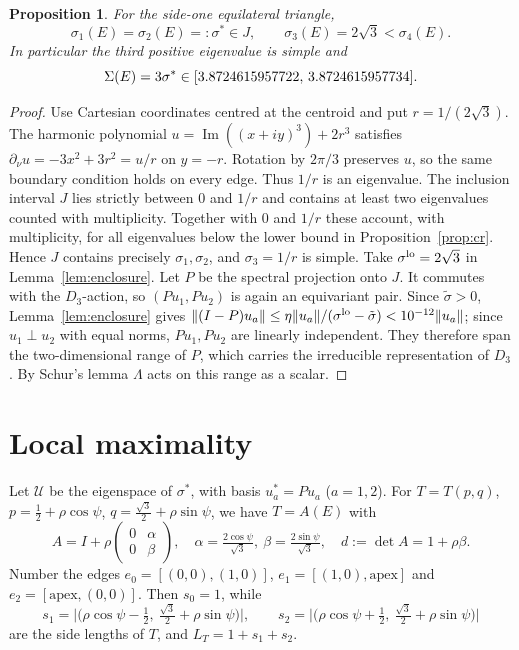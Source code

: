 \documentclass[11pt]{article}
\newtheorem{proposition}[theorem]{Proposition}
\theoremstyle{definition}
\theoremstyle{remark}
\newcommand{\Lam}{\Lambda}
\renewcommand{\Im}{\operatorname{Im}}
\begin{document}
\begin{proposition}\label{prop:eq}
For the side-one equilateral triangle,
\[
\sigma_1(E)=\sigma_2(E)=:\sigma^*\in J,\qquad \sigma_3(E)=2\sqrt3<\sigma_4(E).
\]
In particular the third positive eigenvalue is simple and
\[\Sigma(E)=3\sigma^*\in[3.8724615957722,\,3.8724615957734].\]
\end{proposition}
\begin{proof}
Use Cartesian coordinates centred at the centroid and put $r=1/(2\sqrt3)$. The harmonic polynomial
$u=\Im((x+iy)^3)+2r^3$ satisfies $\partial_\nu u=-3x^2+3r^2=u/r$ on $y=-r$.
Rotation by $2\pi/3$ preserves $u$, so the same boundary condition holds on every edge.
Thus $1/r$ is an eigenvalue. The inclusion interval $J$ lies strictly between $0$ and $1/r$ and
contains at least two eigenvalues counted with multiplicity. Together with $0$ and $1/r$ these
account, with multiplicity, for all eigenvalues below the lower bound in Proposition~\ref{prop:cr}. Hence $J$ contains precisely
$\sigma_1,\sigma_2$, and $\sigma_3=1/r$ is simple. Take $\sigma^{\rm lo}=2\sqrt3$ in Lemma~\ref{lem:enclosure}.
Let $P$ be the spectral projection onto $J$. It commutes with the
$D_3$-action, so $(Pu_1,Pu_2)$ is again an equivariant pair. Since $\tilde\sigma>0$, Lemma~\ref{lem:enclosure} gives
$\|(I-P)u_a\|\le\eta\|u_a\|/(\sigma^{\rm lo}-\tilde\sigma)<10^{-12}\|u_a\|$; since $u_1\perp u_2$ with equal
norms, $Pu_1,Pu_2$ are linearly independent. They therefore span the two-dimensional range of $P$, which
carries the irreducible representation of $D_3$. By Schur's lemma $\Lam$ acts on this range as a scalar.
\end{proof}

\section{Local maximality}\label{sec:local}

Let $\mathcal U$ be the eigenspace of $\sigma^*$, with basis $u^*_a=Pu_a$ ($a=1,2$). For
$T=T(p,q)$, $p=\frac12+\rho\cos\psi$, $q=\frac{\sqrt3}{2}+\rho\sin\psi$, we have $T=A(E)$ with
\[A=I+\rho\begin{pmatrix}0&\alpha\\0&\beta\end{pmatrix},\quad \alpha=\tfrac{2\cos\psi}{\sqrt3},\ \beta=\tfrac{2\sin\psi}{\sqrt3},\quad d:=\det A=1+\rho\beta .\]
Number the edges $e_0=[(0,0),(1,0)]$, $e_1=[(1,0),\text{apex}]$ and $e_2=[\text{apex},(0,0)]$. Then
$s_0=1$, while
\[s_1=\bigl|\bigl(\rho\cos\psi-\tfrac12,\ \tfrac{\sqrt3}2+\rho\sin\psi\bigr)\bigr|,\qquad
s_2=\bigl|\bigl(\rho\cos\psi+\tfrac12,\ \tfrac{\sqrt3}2+\rho\sin\psi\bigr)\bigr|\]
are the side lengths of $T$, and $L_T=1+s_1+s_2$.
\end{document}
